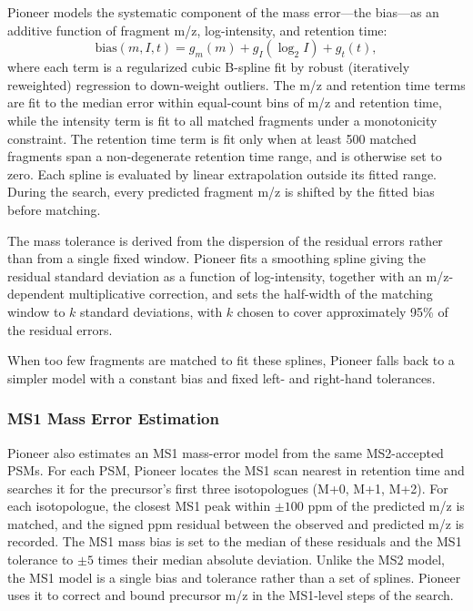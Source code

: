 \documentclass[pdflatex,sn-nature]{sn-jnl}
\begin{document}
Pioneer models the systematic component of the mass error---the bias---as an additive function of fragment m/z, log-intensity, and retention time:
\begin{equation}
    \text{bias}(m, I, t) = g_{m}(m) + g_{I}(\log_2 I) + g_{t}(t),
\end{equation}
where each term is a regularized cubic B-spline fit by robust (iteratively reweighted) regression to down-weight outliers. The m/z and retention time terms are fit to the median error within equal-count bins of m/z and retention time, while the intensity term is fit to all matched fragments under a monotonicity constraint. The retention time term is fit only when at least 500 matched fragments span a non-degenerate retention time range, and is otherwise set to zero. Each spline is evaluated by linear extrapolation outside its fitted range. During the search, every predicted fragment m/z is shifted by the fitted bias before matching.

The mass tolerance is derived from the dispersion of the residual errors rather than from a single fixed window. Pioneer fits a smoothing spline giving the residual standard deviation as a function of log-intensity, together with an m/z-dependent multiplicative correction, and sets the half-width of the matching window to $k$ standard deviations, with $k$ chosen to cover approximately 95\% of the residual errors.

When too few fragments are matched to fit these splines, Pioneer falls back to a simpler model with a constant bias and fixed left- and right-hand tolerances.


\subsubsection{MS1 Mass Error Estimation}\label{subsubsec:ms1-mass-error-estimation}

Pioneer also estimates an MS1 mass-error model from the same MS2-accepted PSMs. For each PSM, Pioneer locates the MS1 scan nearest in retention time and searches it for the precursor's first three isotopologues (M+0, M+1, M+2). For each isotopologue, the closest MS1 peak within $\pm 100$ ppm of the predicted m/z is matched, and the signed ppm residual between the observed and predicted m/z is recorded. The MS1 mass bias is set to the median of these residuals and the MS1 tolerance to $\pm 5$ times their median absolute deviation. Unlike the MS2 model, the MS1 model is a single bias and tolerance rather than a set of splines. Pioneer uses it to correct and bound precursor m/z in the MS1-level steps of the search.
\end{document}
